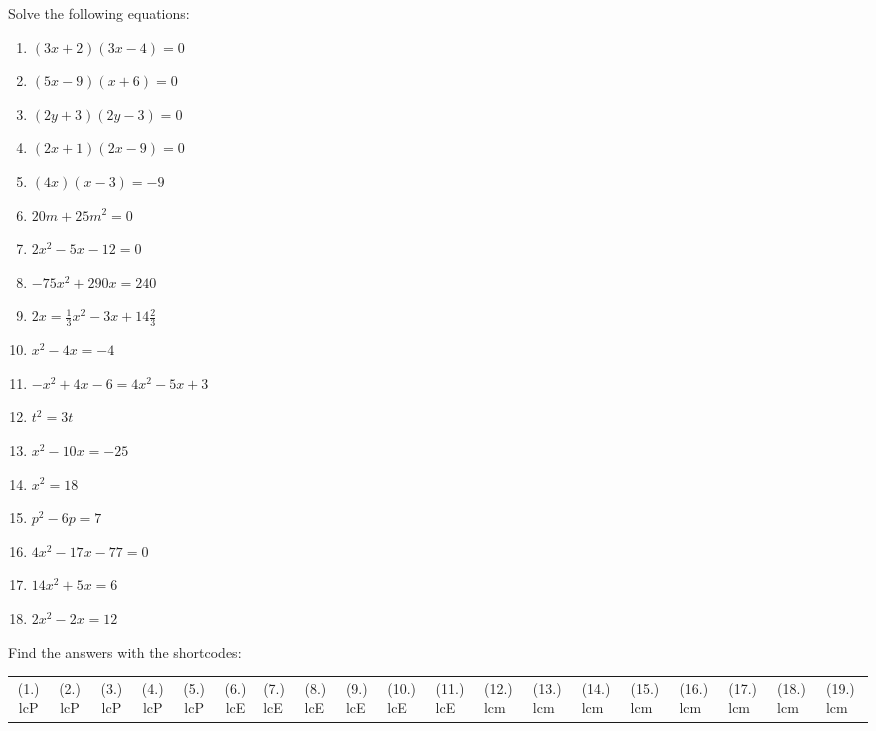 \begin{exercises}{ }
{
Solve the following equations:
\begin{multicols}{2}
\begin{enumerate}[noitemsep, label=\textbf{\arabic*}. ] 
\item  $(3x+2)(3x-4)=0$
\item  $(5x-9)(x+6)=0$
\item  $(2y+3)(2y-3)=0$ 
\item  $(2x+1)(2x-9)=0$    
\item  $(4x)(x-3)=-9$       
\item  $20m+25{m}^{2}=0$
\item  $2{x}^{2}-5x-12=0$  
\item  $-75{x}^{2}+290x=240$
\item  $2x=\frac{1}{3}{x}^{2}-3x+14\frac{2}{3}$
\item  ${x}^{2}-4x=-4$      
\item  $-{x}^{2}+4x-6=4{x}^{2}-5x+3$       
\item  ${t}^{2}=3t$  
\item  ${x}^{2}-10x=-25$      
\item  ${x}^{2}=18$
\item  ${p}^{2}-6p=7$
\item  $4{x}^{2}-17x-77=0$
\item  $14{x}^{2}+5x=6$
\item  $2{x}^{2}-2x=12$              
\end{enumerate}
\end{multicols}
\par {} Find the answers with the shortcodes:
\par\begin{tabular}[h]{cccccc}
(1.) lcP  &  (2.) lcP  &  (3.) lcP  &  (4.) lcP  &  (5.) lcP  &  (6.) lcE  &  (7.) lcE  &  (8.) lcE  &  (9.) lcE  &  (10.) lcE  &  (11.) lcE  &  (12.) lcm  &  (13.) lcm  &  (14.) lcm  &  (15.) lcm  &  (16.) lcm  &  (17.) lcm  &  (18.) lcm  &  (19.) lcm  & \end{tabular}
}
\end{exercises}
